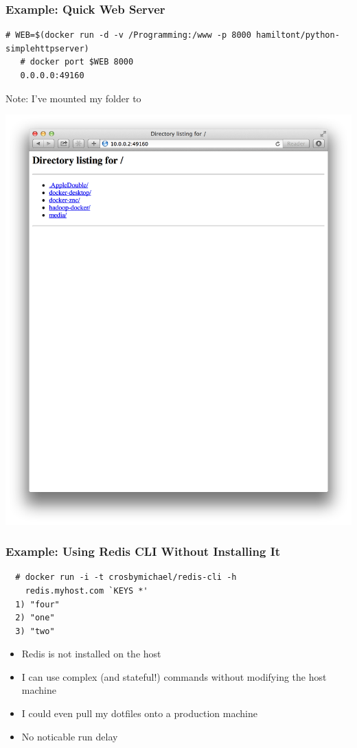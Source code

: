 \documentclass[xcolor=dvipsnames]{beamer}
\newcommand{\cpause}{}
\begin{document}
\begin{frame}[fragile]
  \frametitle{Example: Quick Web Server}
  \begin{lstlisting}[basicstyle=\tiny]
   # WEB=$(docker run -d -v /Programming:/www -p 8000 hamiltont/python-simplehttpserver)
   # docker port $WEB 8000
   0.0.0.0:49160
  \end{lstlisting}

  Note: I've mounted my  folder to  
  
  \includegraphics[width=\textwidth]{figures/python-webserver.png}
\end{frame}

\begin{frame}[fragile]
  \frametitle{Example: Using Redis CLI Without Installing It}
  \begin{lstlisting}
  # docker run -i -t crosbymichael/redis-cli -h 
    redis.myhost.com `KEYS *'
  1) "four"
  2) "one"
  3) "two"
  \end{lstlisting}

  \begin{itemize}
    \item Redis is not installed on the host \cpause

    \item I can use complex (and stateful!) commands without modifying the 
    host machine \cpause

    \item I could even pull my dotfiles onto a production machine \cpause

    \item No noticable run delay
  \end{itemize}

\end{frame}
\end{document}

